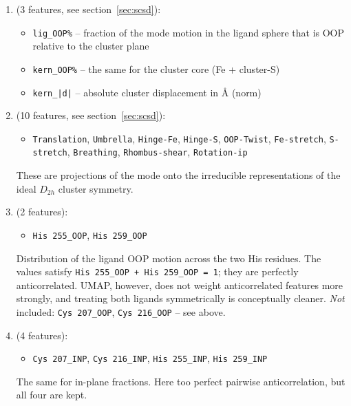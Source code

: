 \documentclass[11pt,a4paper,twoside]{article}
\theoremstyle{remark}
\begin{document}
\begin{enumerate}\setlength{\itemsep}{0pt}\setlength{\parsep}{0pt}
  \item[\textbf{Cluster-ring fractions}] (3 features, see
        section~\ref{sec:scsd}):
        \begin{itemize}\setlength{\itemsep}{0pt}
          \item \texttt{lig\_OOP\%} -- fraction of the mode motion
                in the ligand sphere that is OOP relative to the
                cluster plane
          \item \texttt{kern\_OOP\%} -- the same for the cluster
                core (Fe + cluster-S)
          \item \texttt{kern\_|d|} -- absolute cluster
                displacement in \AA{} (norm)
        \end{itemize}

  \item[\textbf{Kernel scores / $D_{2h}$ irreps}] (10 features,
        see section~\ref{sec:scsd}):
        \begin{itemize}\setlength{\itemsep}{0pt}
          \item \texttt{Translation}, \texttt{Umbrella},
                \texttt{Hinge-Fe}, \texttt{Hinge-S},
                \texttt{OOP-Twist}, \texttt{Fe-stretch},
                \texttt{S-stretch}, \texttt{Breathing},
                \texttt{Rhombus-shear}, \texttt{Rotation-ip}
        \end{itemize}
        These are projections of the mode onto the irreducible
        representations of the ideal $D_{2h}$ cluster symmetry.

  \item[\textbf{Ligand OOP fractions}] (2 features):
        \begin{itemize}\setlength{\itemsep}{0pt}
          \item \texttt{His 255\_OOP}, \texttt{His 259\_OOP}
        \end{itemize}
        Distribution of the ligand OOP motion across the two His
        residues. The values satisfy
        \texttt{His 255\_OOP + His 259\_OOP = 1}; they are
        perfectly anticorrelated. UMAP, however, does not weight
        anticorrelated features more strongly, and treating both
        ligands symmetrically is conceptually cleaner.
        \emph{Not} included: \texttt{Cys 207\_OOP},
        \texttt{Cys 216\_OOP} -- see above.

  \item[\textbf{Ligand INP fractions}] (4 features):
        \begin{itemize}\setlength{\itemsep}{0pt}
          \item \texttt{Cys 207\_INP}, \texttt{Cys 216\_INP},
                \texttt{His 255\_INP}, \texttt{His 259\_INP}
        \end{itemize}
        The same for in-plane fractions. Here too perfect
        pairwise anticorrelation, but all four are kept.


\end{enumerate}
\end{document}
